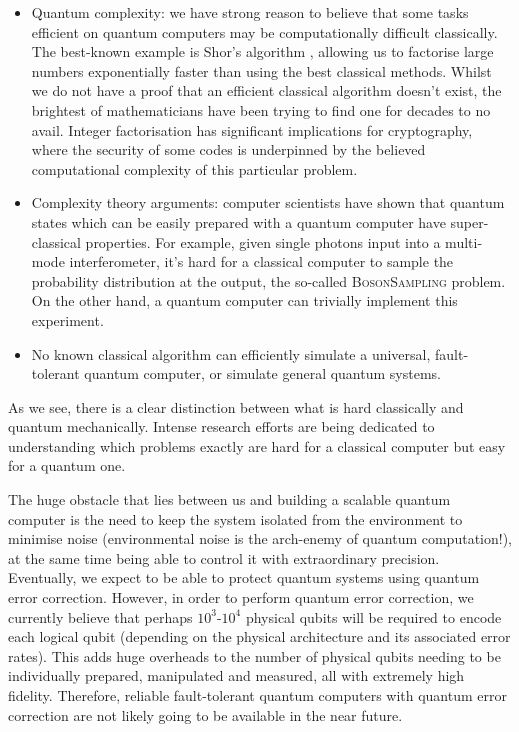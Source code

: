 \begin{itemize}
\item Quantum complexity: we have strong reason to believe that some tasks efficient on quantum computers may be computationally difficult classically. The best-known example is Shor's algorithm \cite{bib:ShorFactor}, allowing us to factorise large numbers exponentially  faster than using the best classical methods. Whilst we do not have a proof that an efficient classical algorithm doesn't exist, the brightest of mathematicians have been trying to find one for decades to no avail. Integer factorisation has significant implications for cryptography, where the security of some codes is underpinned by the believed computational complexity of this particular problem. 
\item Complexity theory arguments: computer scientists have shown that quantum states which can be easily prepared with a quantum computer have super-classical properties. For example, given single photons input into a multi-mode interferometer, it's hard for a classical computer to sample the probability distribution at the output, the so-called \textsc{BosonSampling} problem. On the other hand, a quantum computer can trivially implement this experiment.
\item No known classical algorithm can efficiently simulate a universal, fault-tolerant quantum computer, or simulate general quantum systems.
\end{itemize}

As we see, there is a clear distinction between what is hard classically and quantum mechanically. Intense research efforts are being dedicated to understanding which problems exactly are hard for a classical computer but easy for a quantum one.

The huge obstacle that lies between us and building a scalable quantum computer is the need to keep the system isolated from the environment to minimise noise (environmental noise is the arch-enemy of quantum computation!), at the same time being able to control it with extraordinary precision. Eventually, we expect to be able to protect quantum systems using quantum error correction. However, in order to perform quantum error correction, we currently believe that perhaps $10^3$-$10^4$ physical qubits will be required to encode each logical qubit (depending on the physical architecture and its associated error rates). This adds huge overheads to the number of physical qubits needing to be individually prepared, manipulated and measured, all with extremely high fidelity. Therefore, reliable fault-tolerant quantum computers with quantum error correction are not likely going to be available in the near future.

